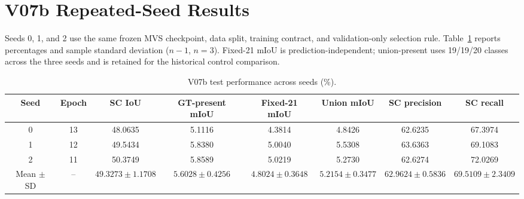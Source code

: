 \section{V07b Repeated-Seed Results}
\label{app:v07b-seeds}

Seeds 0, 1, and 2 use the same frozen MVS checkpoint, data split, training
contract, and validation-only selection rule. Table~\ref{tab:v07b-seed-summary}
reports percentages and sample standard deviation ($n-1$, $n=3$). Fixed-21
mIoU is prediction-independent; union-present uses 19/19/20 classes across the
three seeds and is retained for the historical control comparison.

\begin{table}[t]
\centering
\caption{V07b test performance across seeds (\%).}
\label{tab:v07b-seed-summary}
\scriptsize
\setlength{\tabcolsep}{3pt}
\begin{tabular}{cccccccc}
\toprule
Seed & Epoch & SC IoU & GT-present mIoU & Fixed-21 mIoU & Union mIoU & SC precision & SC recall \\
\midrule
0 & 13 & 48.0635 & 5.1116 & 4.3814 & 4.8426 & 62.6235 & 67.3974 \\
1 & 12 & 49.5434 & 5.8380 & 5.0040 & 5.5308 & 63.6363 & 69.1083 \\
2 & 11 & 50.3749 & 5.8589 & 5.0219 & 5.2730 & 62.6274 & 72.0269 \\
\midrule
Mean $\pm$ SD & -- & $49.3273\pm1.1708$ & $5.6028\pm0.4256$ & $4.8024\pm0.3648$ & $5.2154\pm0.3477$ & $62.9624\pm0.5836$ & $69.5109\pm2.3409$ \\
\bottomrule
\end{tabular}
\end{table}

